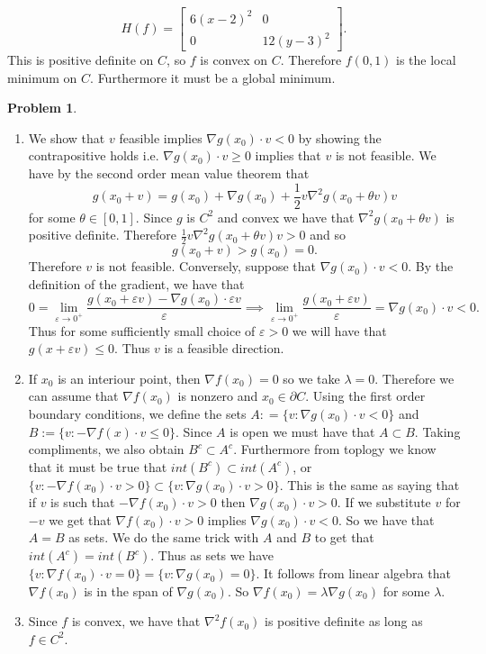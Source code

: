 \documentclass[12pt, a4paper]{article}
\newtheorem{problem}{Problem}
\theoremstyle{definition}
\newcommand{\penum}{ \begin{enumerate}[label=\bf(\alph*), leftmargin=0pt]}
\newcommand{\epenum}{ \end{enumerate} }
\newcommand{\bd}{\partial}
\newcommand{\grad}{\nabla}
\newcommand{\ep}{\varepsilon}
\newcommand{\bmat}[1]{\begin{bmatrix}#1\end{bmatrix}}
\begin{document}
$$H(f) = \bmat{6(x-2)^2 & 0 \\ 0 & 12(y-3)^2}.$$
This is positive definite on $C$, so $f$ is convex on $C$. Therefore $f(0,1)$ is the local minimum on $C$. Furthermore it must be a global minimum. 
\newpage
\begin{problem}
\end{problem}
\penum 
\item We show that $v$ feasible implies $\grad g(x_0) \cdot v<0$ by showing the contrapositive holds i.e. $\grad g(x_0)\cdot v \geq 0$ implies that $v$ is not feasible. We have by the second order mean value theorem that 
$$g(x_0 + v ) = g(x_0)  + \grad g(x_0) + \frac{1}{2} v \grad^2 g(x_0 + \theta v)v $$
 for some $\theta \in [0,1]$. Since $g$ is $C^2$ and convex we have that $\grad^2 g(x_0 + \theta v)$ is positive definite. Therefore $\frac{1}{2}v \grad^2 g(x_0 + \theta v) v >0$ and so 
 $$ g(x_0 + v ) > g(x_0) = 0.$$
 Therefore $v$ is not feasible. Conversely, suppose that $\grad g(x_0) \cdot v<0$. By the definition of the gradient, we have that 
 $$ 0 = \lim_{\ep \to 0^+} \frac{g(x_0 + \ep v)  - \grad g(x_0) \cdot \ep v}{\ep} \implies \lim_{\ep \to 0^+} \frac{g(x_0 + \ep v)}{\ep} = \grad g (x_0) \cdot v <0.$$
 Thus for some sufficiently small choice of $\ep>0$ we will have that $g(x + \ep v) \leq 0$. Thus $v$ is a feasible direction. 
 \item If $x_0$ is an interiour point, then $\grad f(x_0) = 0$ so we take $\lambda = 0$. Therefore we can assume that $\grad f(x_0)$ is nonzero and $x_0 \in \bd C$. Using the first order boundary conditions, we define the sets $A : = \{v: \grad g(x_0) \cdot v <0\}$ and $B:= \{v: -\grad f(x) \cdot v \leq 0\}$. Since $A$ is open we must have that $A \subset B$. Taking compliments, we also obtain $B^c \subset A^c$. Furthermore from toplogy we know that it must be true that $int (B^c) \subset int(A^c)$, or $\{v : - \grad f(x_0) \cdot v >0\} \subset \{ v: \grad g(x_0) \cdot v >0\}$. This is the same as saying that if $v$ is such that $- \grad f(x_0) \cdot v >0$ then $\grad g(x_0) \cdot v >0$. If we substitute $v$ for $-v$ we get that $\grad f(x_0) \cdot v >0$ implies $\grad g(x_0) \cdot v <0$. So we have that $A= B$ as sets. We do the same trick with $A$ and $B$ to get that $int(A^c) = int(B^c)$. Thus as sets we have $\{v: \grad f(x_0) \cdot v = 0\} = \{v : \grad g(x_0) = 0\}$. It follows from linear algebra that $\grad f(x_0)$ is in the span of $\grad g(x_0)$. So $\grad f(x_0) = \lambda \grad g(x_0)$ for some $\lambda$.  
 \item Since $f$ is convex, we have that $\grad^2 f(x_0)$ is positive definite as long as $f\in C^2$. 
\epenum
\end{document}
